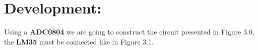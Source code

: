 \section{Development:}

Using a {\bfseries ADC0804} we are going to construct the circuit presented in Figure 3.0, the {\bfseries LM35} must be connected like in Figure 3.1.
